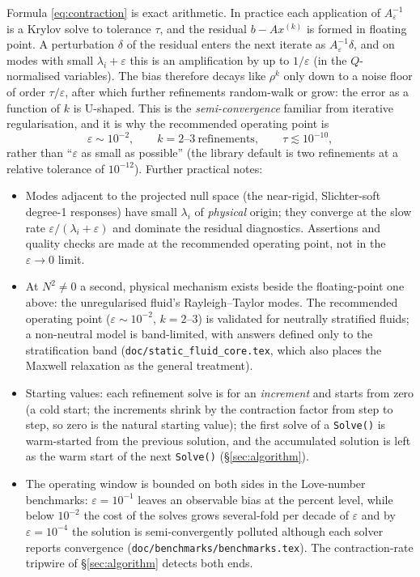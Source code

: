 \documentclass[11pt]{article}
\newcommand{\eps}{\varepsilon}
\begin{document}
Formula \eqref{eq:contraction} is exact arithmetic. In practice each
application of $A_{\eps}^{-1}$ is a Krylov solve to tolerance $\tau$,
and the residual $b - A x^{(k)}$ is formed in floating point. A
perturbation $\delta$ of the residual enters the next iterate as
$A_{\eps}^{-1}\delta$, and on modes with small $\lambda_{i} + \eps$
this is an amplification by up to $1/\eps$ (in the $Q$-normalised
variables). The bias therefore decays like $\rho^{k}$ only down to a
noise floor of order $\tau/\eps$, after which further refinements
random-walk or grow: the error as a function of $k$ is U-shaped. This
is the \emph{semi-convergence} familiar from iterative regularisation,
and it is why the recommended operating point is
\begin{equation}
  \eps \sim 10^{-2}, \qquad k = 2\text{--}3 \ \text{refinements},
  \qquad \tau \lesssim 10^{-10} ,
\end{equation}
rather than ``$\eps$ as small as possible'' (the library default is
two refinements at a relative tolerance of $10^{-12}$). Further
practical notes:
\begin{itemize}
\item Modes adjacent to the projected null space (the near-rigid,
  Slichter-soft degree-1 responses) have small $\lambda_{i}$ of
  \emph{physical} origin; they converge at the slow rate
  $\eps/(\lambda_{i}+\eps)$ and dominate the residual diagnostics.
  Assertions and quality checks are made at the recommended operating
  point, not in the $\eps \to 0$ limit.
\item At $N^2 \neq 0$ a second, physical mechanism exists beside the
  floating-point one above: the unregularised fluid's Rayleigh--Taylor
  modes. The recommended operating point ($\eps \sim 10^{-2}$,
  $k = 2$--$3$) is validated for neutrally stratified fluids; a
  non-neutral model is band-limited, with answers defined only to the
  stratification band (\texttt{doc/static\_fluid\_core.tex}, which
  also places the Maxwell relaxation as the general treatment).
\item Starting values: each refinement solve is for an
  \emph{increment} and starts from zero (a cold start; the increments
  shrink by the contraction factor from step to step, so zero is the
  natural starting value); the first solve of a
  \texttt{Solve()} is warm-started from the previous solution, and the
  accumulated solution is left as the warm start of the next
  \texttt{Solve()} (\S\ref{sec:algorithm}).
\item The operating window is bounded on both sides in the
  Love-number benchmarks: $\eps = 10^{-1}$ leaves an observable bias at
  the percent level, while below $10^{-2}$ the cost of the solves grows
  several-fold per decade of $\eps$ and by $\eps = 10^{-4}$ the solution
  is semi-convergently polluted although each solver reports
  convergence (\texttt{doc/benchmarks/benchmarks.tex}). The contraction-rate
  tripwire of \S\ref{sec:algorithm} detects both ends.
\end{itemize}
\end{document}
